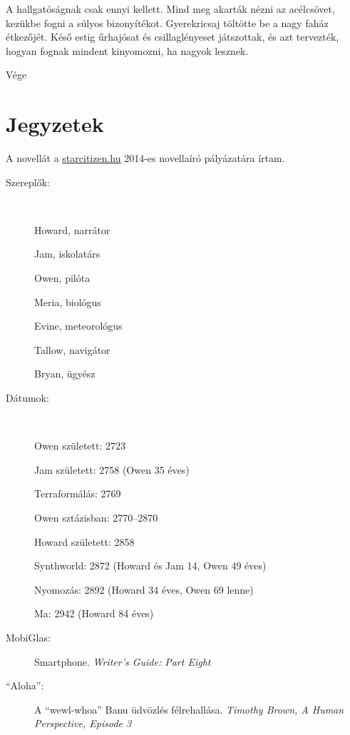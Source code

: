 \documentclass[10pt]{memoir}
\begin{document}
A hallgatóságnak csak ennyi kellett. Mind meg akarták nézni az acélcsövet,
kezükbe fogni a súlyos bizonyítékot. Gyerekricsaj töltötte be a nagy faház
étkezőjét. Késő estig űrhajósat és csillaglényeset játszottak, és azt
tervezték, hogyan fognak mindent kinyomozni, ha nagyok lesznek.

\upshape

\begin{center}
Vége
\end{center}

\chapter*{Jegyzetek}

A novellát a \url{starcitizen.hu} 2014-es novellaíró pályázatára írtam.

\begin{description}

\item[Szereplők:] ~ \par
Howard, narrátor \par
Jam, iskolatárs \par
Owen, pilóta \par
Meria, biológus \par
Evine, meteorológus \par
Tallow, navigátor \par
Bryan, ügyész \par

\item[Dátumok:] ~ \par
Owen született: 2723 \par
Jam született: 2758 (Owen 35 éves) \par
Terraformálás: 2769 \par
Owen sztázisban: 2770–2870 \par
Howard született: 2858 \par
Synthworld: 2872 (Howard és Jam 14, Owen 49 éves) \par
Nyomozás: 2892 (Howard 34 éves, Owen 69 lenne) \par
Ma: 2942 (Howard 84 éves) \par

\item[MobiGlas:] Smartphone. \textit{Writer's Guide: Part Eight}

\item[``Aloha'':] A ``wewl-whoa'' Banu üdvözlés félrehallása. \textit{Timothy
Brown, A Human Perspective, Episode 3}


\end{description}
\end{document}
